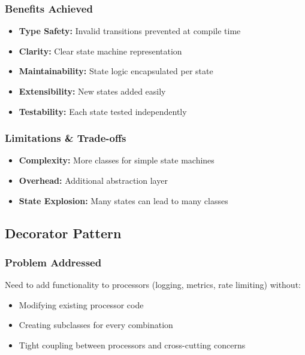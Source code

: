\documentclass[11pt, a4paper]{article}
\theoremstyle{plain}
\theoremstyle{definition}
\begin{document}
\subsubsection{Benefits Achieved}

\begin{itemize}
    \item \textbf{Type Safety:} Invalid transitions prevented at compile time
    \item \textbf{Clarity:} Clear state machine representation
    \item \textbf{Maintainability:} State logic encapsulated per state
    \item \textbf{Extensibility:} New states added easily
    \item \textbf{Testability:} Each state tested independently
\end{itemize}

\subsubsection{Limitations \& Trade-offs}

\begin{itemize}
    \item \textbf{Complexity:} More classes for simple state machines
    \item \textbf{Overhead:} Additional abstraction layer
    \item \textbf{State Explosion:} Many states can lead to many classes
\end{itemize}

\subsection{Decorator Pattern}

\subsubsection{Problem Addressed}

Need to add functionality to processors (logging, metrics, rate limiting) without:
\begin{itemize}
    \item Modifying existing processor code
    \item Creating subclasses for every combination
    \item Tight coupling between processors and cross-cutting concerns
\end{itemize}
\end{document}
